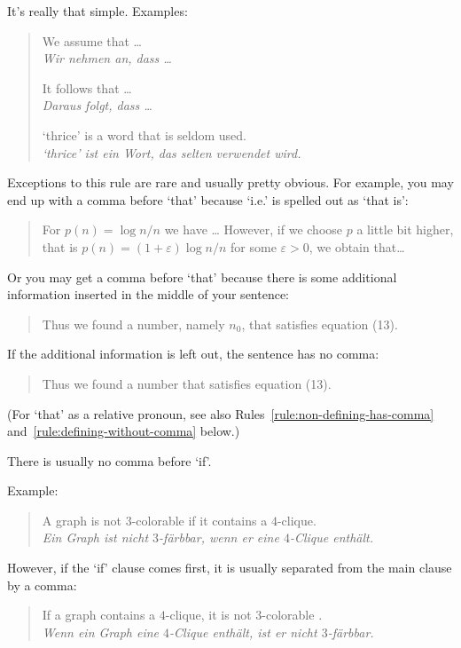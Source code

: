 It's really that simple. Examples:
\begin{quote}
  We assume that \ldots\\
  \emph{Wir nehmen an, dass \ldots}

  It follows that \ldots\\
  \emph{Daraus folgt, dass \ldots}

  `thrice' is a word that is seldom used.\\
  \emph{`thrice' ist ein Wort, das selten verwendet wird.}
\end{quote}
Exceptions to this rule are rare and usually pretty obvious. For
example, you may end up with a comma before `that' because `i.e.' is
spelled out as `that is':
\begin{quote}
  For \(p(n)=\log n/n\) we have \ldots{} However, if we choose \(p\) a
  little bit higher, that is \(p(n)=(1+\varepsilon)\log n/n\) for some
  \(\varepsilon>0\), we obtain that\ldots
\end{quote}
Or you may get a comma before `that' because there is some additional
information inserted in the middle of your sentence:
\begin{quote}
  Thus we found a number, namely \(n_0\), that satisfies equation (13).
\end{quote}
If the additional information is left out, the sentence has no comma:
\begin{quote}
  Thus we found a number that satisfies equation (13).
\end{quote}
(For `that' as a relative pronoun, see also
Rules~\ref{rule:non-defining-has-comma}
and~\ref{rule:defining-without-comma} below.)

\begin{Rule}
  There is usually no comma before `if'.
\end{Rule}

Example:
\begin{quote}
  A graph is not \(3\)-colorable if it contains a \(4\)-clique.\\
  \emph{Ein Graph ist nicht \(3\)-färbbar, wenn er eine \(4\)-Clique
    enthält.}
\end{quote}
However, if the `if' clause comes first, it is usually separated from
the main clause by a comma:
\begin{quote}
  If a graph contains a \(4\)-clique, it is not \(3\)-colorable .\\
  \emph{Wenn ein Graph eine \(4\)-Clique enthält, ist er nicht
    \(3\)-färbbar.}
\end{quote}

